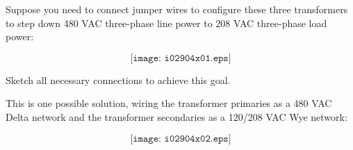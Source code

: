 

Suppose you need to connect jumper wires to configure these three transformers to step down 480 VAC three-phase line power to 208 VAC three-phase load power:

$$\texttt{[image: i02904x01.eps]}$$

Sketch all necessary connections to achieve this goal.







This is one possible solution, wiring the transformer primaries as a 480 VAC Delta network and the transformer secondaries as a 120/208 VAC Wye network:

$$\texttt{[image: i02904x02.eps]}$$











